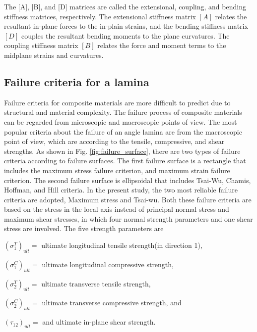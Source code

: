 The [A], [B], and [D] matrices are called the extensional, coupling, and bending stiffness matrices,
respectively. The extensional stiffness matrix $[A]$ relates the resultant in-plane forces to the
in-plain strains, and the bending stiffness matrix $[D]$ couples the resultant bending moments to
the plane curvatures.  The coupling stiffness matrix $[B]$ relates the force and moment terms to the
midplane strains and curvatures.

\subsection{Failure criteria for a lamina}

Failure criteria for composite materials are more difficult to predict due to
structural and material complexity. The failure process of composite materials
can be regarded from microscopic and macroscopic points of view. The most
popular criteria about the failure of an angle lamina are from the macroscopic
point of view, which are according to the tensile, compressive, and shear
strengths. As shown in Fig. \ref{fig:failure_surface}, there are two types of failure
criteria\cite{massard1984computer,reddy1987first,fang1993design,soeiro1994multilevel,pelletier2006multi,jadhav2007parametric,omkar2008artificial,choudhury2019failure}
according to failure surfaces. The first failure surface is a rectangle that
includes the maximum stress failure criterion\cite{watkins1987multicriteria},
and maximum strain failure criterion. The second failure surface is ellipsoidal
that includes Tsai-Wu\cite{martin1987optimum,soares1995discrete}, Chamis,
Hoffman, and Hill criteria. In the present study, the two most reliable failure
criteria are adopted, Maximum stress and Tsai-wu. Both these failure criteria
are based on the stress in the local axis instead of principal normal stress and
maximum shear stresses, in which four normal strength parameters and one shear
stress are involved. The five strength parameters are

$(\sigma _1^{T})_{ult}= $ ultimate longitudinal tensile strength(in direction 1),

$(\sigma _1^{C})_{ult}= $ ultimate longitudinal compressive strength,

$(\sigma _2^{T})_{ult}= $ ultimate transverse tensile strength,

$(\sigma _2^{C})_{ult}= $ ultimate transverse compressive strength, and

$(\tau_{12})_{ult}= $ and ultimate in-plane shear strength.

